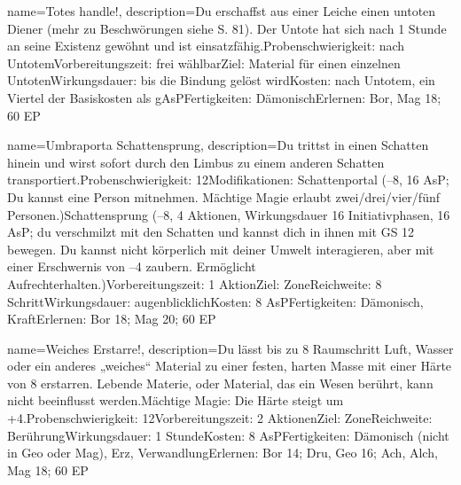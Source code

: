 {
    name={Totes handle!},
    description={Du erschaffst aus einer Leiche einen untoten Diener (mehr zu Beschwörungen siehe S. 81). Der Untote hat sich nach 1 Stunde an seine Existenz gewöhnt und ist einsatzfähig.\newline Probenschwierigkeit: nach Untotem\newline Vorbereitungszeit: frei wählbar\newline Ziel: Material für einen einzelnen Untoten\newline Wirkungsdauer: bis die Bindung gelöst wird\newline Kosten: nach Untotem, ein Viertel der Basiskosten als gAsP\newline Fertigkeiten: Dämonisch\newline Erlernen: Bor, Mag 18; 60 EP}
}


{
    name={Umbraporta Schattensprung},
    description={Du trittst in einen Schatten hinein und wirst sofort durch den Limbus zu einem anderen Schatten transportiert.\newline Probenschwierigkeit: 12\newline Modifikationen: Schattenportal (–8, 16 AsP; Du kannst eine Person mitnehmen. Mächtige Magie erlaubt zwei/drei/vier/fünf Personen.)\newline Schattensprung (–8, 4 Aktionen, Wirkungsdauer 16 Initiativphasen, 16 AsP; du verschmilzt mit den Schatten und kannst dich in ihnen mit GS 12 bewegen. Du kannst nicht körperlich mit deiner Umwelt interagieren, aber mit einer Erschwernis von –4 zaubern. Ermöglicht Aufrechterhalten.)\newline Vorbereitungszeit: 1 Aktion\newline Ziel: Zone\newline Reichweite: 8 Schritt\newline Wirkungsdauer: augenblicklich\newline Kosten: 8 AsP\newline Fertigkeiten: Dämonisch, Kraft\newline Erlernen: Bor 18; Mag 20; 60 EP}
}


{
    name={Weiches Erstarre!},
    description={Du lässt bis zu 8 Raumschritt Luft, Wasser oder ein anderes „weiches“ Material zu einer festen, harten Masse mit einer Härte von 8 erstarren. Lebende Materie, oder Material, das ein Wesen berührt, kann nicht beeinflusst werden.\newline Mächtige Magie: Die Härte steigt um +4.\newline Probenschwierigkeit: 12\newline Vorbereitungszeit: 2 Aktionen\newline Ziel: Zone\newline Reichweite: Berührung\newline Wirkungsdauer: 1 Stunde\newline Kosten: 8 AsP\newline Fertigkeiten: Dämonisch (nicht in Geo oder Mag), Erz, Verwandlung\newline Erlernen: Bor 14; Dru, Geo 16; Ach, Alch, Mag 18; 60 EP}
}


